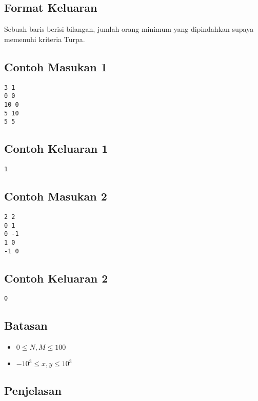 \documentclass{article}
\begin{document}
\subsection*{Format Keluaran}

\par\noindent Sebuah baris berisi bilangan, jumlah orang minimum yang dipindahkan supaya memenuhi kriteria Turpa.

\subsection*{Contoh Masukan 1}

\begin{lstlisting}
3 1
0 0
10 0
5 10
5 5
\end{lstlisting}

\subsection*{Contoh Keluaran 1}

\begin{lstlisting}
1
\end{lstlisting}

\subsection*{Contoh Masukan 2}

\begin{lstlisting}
2 2
0 1
0 -1
1 0
-1 0
\end{lstlisting}

\subsection*{Contoh Keluaran 2}

\begin{lstlisting}
0
\end{lstlisting}

\subsection*{Batasan}

\begin{itemize}
  \item $0 \leq N,M \leq 100$
  \item $-10^3 \leq x, y \leq 10^3$
\end{itemize}

\subsection*{Penjelasan}
\end{document}
